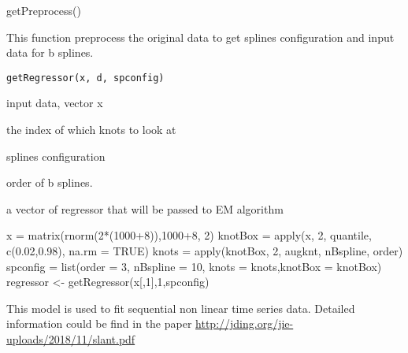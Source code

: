 \documentclass[a4paper]{book}
\begin{document}
%
\begin{Examples}
\begin{ExampleCode}
getPreprocess()
\end{ExampleCode}
\end{Examples}
%
\begin{Description}\relax
This function preprocess the original data to get splines configuration and input data for b splines.
\end{Description}
%
\begin{Usage}
\begin{verbatim}
getRegressor(x, d, spconfig)
\end{verbatim}
\end{Usage}
%
\begin{Arguments}
\begin{ldescription}
\item[\code{x}] input data, vector x

\item[\code{d}] the index of which knots to look at

\item[\code{spconfig}] splines configuration

\item[\code{order}] order of b splines.
\end{ldescription}
\end{Arguments}
%
\begin{Value}
a vector of regressor that will be passed to EM algorithm
\end{Value}
%
\begin{Examples}
\begin{ExampleCode}
x =  matrix(rnorm(2*(1000+8)),1000+8, 2)
knotBox = apply(x, 2, quantile, c(0.02,0.98), na.rm = TRUE)
knots = apply(knotBox, 2, augknt, nBspline, order)
spconfig = list(order = 3, nBspline = 10, knots = knots,knotBox = knotBox)
regressor <- getRegressor(x[,1],1,spconfig)
\end{ExampleCode}
\end{Examples}
%
\begin{Description}\relax
This model is used to fit sequential non linear time series data. Detailed information could be find in the paper \url{http://jding.org/jie-uploads/2018/11/slant.pdf}
\end{Description}
\end{document}

